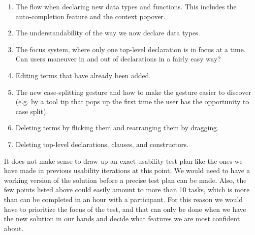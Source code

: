 \begin{enumerate}
	\item The flow when declaring new data types and functions. This includes the auto-completion feature and the context popover.
	\item The understandability of the way we now declare data types.
	\item The focus system, where only one top-level declaration is in focus at a
	time. Can users maneuver in and out of declarations in a fairly easy way?
	\item Editing terms that have already been added.
	\item The new case-splitting gesture and how to make the gesture easier to
	discover (e.g. by a tool tip that pops up the first time the user has the
	opportunity to case split).
	\item Deleting terms by flicking them and rearranging them by dragging.
	\item Deleting top-level declarations, clauses, and constructors.
\end{enumerate}

It does not make sense to draw up an exact usability test plan like the ones we have made in previous usability
iterations
at this point. We would need to have a working version of the solution before a precise test plan can be made. Also, the few points listed above could easily amount to more than 10 tasks, which is more than can be completed in an hour with a participant. For this reason we would have to prioritize the focus of the test, and that can only be done when we have the new solution in our hands and decide what features we are most confident about. 
